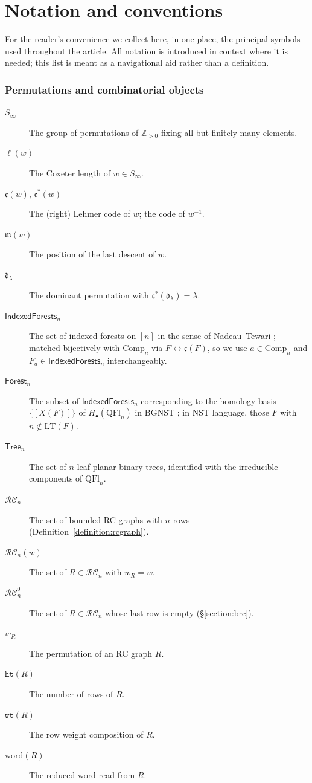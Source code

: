 \documentclass[a4paper,fleqn]{cas-sc}
\theoremstyle{definition}
\theoremstyle{remark}
\numberwithin{equation}{subsection}
\newcommand{\wof}[1]{w_{#1}}
\newcommand{\wtt}{\mathtt{wt}}
\newcommand{\hr}{\mathtt{ht}}
\newcommand{\RC}{\mathcal{RC}}
\newcommand{\dom}{\mathfrak{d}}
\newcommand{\code}{\mathfrak{c}}
\newcommand{\maxd}{\mathfrak{m}}
\begin{document}
\section*{Notation and conventions}\label{section:notation}

For the reader's convenience we collect here, in one place, the principal symbols used throughout the article. All notation is introduced in context where it is needed; this list is meant as a navigational aid rather than a definition.

\begingroup
{}

\subsubsection*{Permutations and combinatorial objects}
\begin{description}
\item[$S_\infty$] The group of permutations of $\mathbb{Z}_{>0}$ fixing all but finitely many elements.
\item[$\ell(w)$] The Coxeter length of $w\in S_\infty$.
\item[$\code(w)$, $\code^*(w)$] The (right) Lehmer code of $w$; the code of $w^{-1}$.
\item[$\maxd(w)$] The position of the last descent of $w$.
\item[$\dom_\lambda$] The dominant permutation with $\code^*(\dom_\lambda)=\lambda$.
\item[$\mathsf{IndexedForests}_n$] The set of indexed forests on $[n]$ in the sense of Nadeau--Tewari \cite{nadeau2024forest}; matched bijectively with $\mathrm{Comp}_n$ via $F\leftrightarrow\code(F)$, so we use $a\in\mathrm{Comp}_n$ and $F_a\in\mathsf{IndexedForests}_n$ interchangeably.
\item[$\mathsf{Forest}_n$] The subset of $\mathsf{IndexedForests}_n$ corresponding to the homology basis $\{[X(F)]\}$ of $H_\bullet(\mathrm{QFl}_n)$ in BGNST \cite[Cor.~11.6]{bergeron2025qsymflag}; in NST language, those $F$ with $n\notin\mathrm{LT}(F)$.
\item[$\mathsf{Tree}_n$] The set of $n$-leaf planar binary trees, identified with the irreducible components of $\mathrm{QFl}_n$.
\item[$\RC_n$] The set of bounded RC graphs with $n$ rows (Definition~\ref{definition:rcgraph}).
\item[$\RC_n(w)$] The set of $R\in\RC_n$ with $\wof{R}=w$.
\item[$\RC_n^0$] The set of $R\in\RC_n$ whose last row is empty (\S\ref{section:brc}).
\item[$\wof{R}$] The permutation of an RC graph $R$.
\item[$\hr(R)$] The number of rows of $R$.
\item[$\wtt(R)$] The row weight composition of $R$.
\item[$\mathrm{word}(R)$] The reduced word read from $R$.
\end{description}
\end{document}
